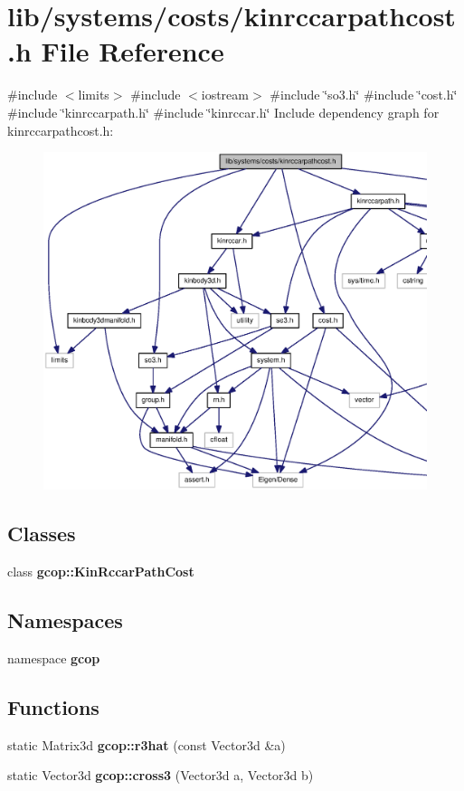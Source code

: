 \section{lib/systems/costs/kinrccarpathcost.h \-File \-Reference}
\label{kinrccarpathcost_8h}
{\ttfamily \#include $<$limits$>$}\*
{\ttfamily \#include $<$iostream$>$}\*
{\ttfamily \#include \char`\"{}so3.\-h\char`\"{}}\*
{\ttfamily \#include \char`\"{}cost.\-h\char`\"{}}\*
{\ttfamily \#include \char`\"{}kinrccarpath.\-h\char`\"{}}\*
{\ttfamily \#include \char`\"{}kinrccar.\-h\char`\"{}}\*
\-Include dependency graph for kinrccarpathcost.\-h\-:
\nopagebreak
\begin{figure}[H]
\begin{center}
\leavevmode
\includegraphics[width=350pt]{kinrccarpathcost_8h__incl}
\end{center}
\end{figure}
\subsection*{\-Classes}
\begin{DoxyCompactItemize}
\item 
class {\bf gcop\-::\-Kin\-Rccar\-Path\-Cost}
\end{DoxyCompactItemize}
\subsection*{\-Namespaces}
\begin{DoxyCompactItemize}
\item 
namespace {\bf gcop}
\end{DoxyCompactItemize}
\subsection*{\-Functions}
\begin{DoxyCompactItemize}
\item 
static \-Matrix3d {\bf gcop\-::r3hat} (const \-Vector3d \&a)
\item 
static \-Vector3d {\bf gcop\-::cross3} (\-Vector3d a, \-Vector3d b)
\end{DoxyCompactItemize}
